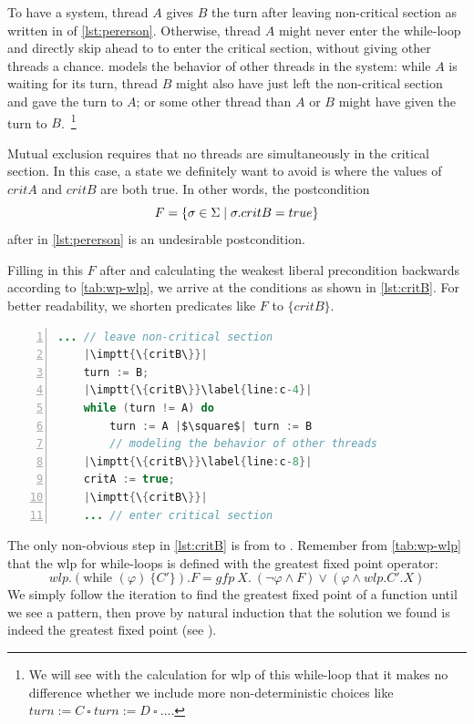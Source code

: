To have a  system, thread $A$ gives $B$ the turn after leaving non-critical section as written in  of \autoref{lst:pererson}. 
Otherwise, thread $A$ might never enter the while-loop and directly skip ahead to  to enter the critical section, without giving other threads a chance. 
 models the behavior of other threads in the system: while $A$ is waiting for its turn, thread $B$ might also have just left the non-critical section and gave the turn to $A$; or some other thread than $A$ or $B$ might have given the turn to $B$.~\footnote{We will see with the calculation for wlp of this while-loop that it makes no difference whether we include more non-deterministic choices like $turn := C\ \square\ turn := D\ \square\ \dots$.} 

Mutual exclusion requires that no threads are simultaneously in the critical section. 
In this case, a state we definitely want to avoid is where the values of $critA$ and $critB$ are both true. 
In other words, the postcondition 
$$F=\{\sigma\in\S\mid \sigma.critB=true\}$$ 
after  in \autoref{lst:pererson} is an undesirable postcondition.

Filling in this $F$ after  and calculating the weakest liberal precondition backwards according to \autoref{tab:wp-wlp}, we arrive at the conditions as shown in \autoref{lst:critB}. 
For better readability, we shorten predicates like $F$ to $\{critB\}$.

\begin{lstlisting}[caption={Weakest Liberal Precondition w.r.t Postcondition $F=\{\sigma\in\S\mid \sigma.critB=true\}$ }, label={lst:critB}, language=java, numbers=left, stepnumber=1, captionpos=b,escapechar=|,frame=single]
	... // leave non-critical section
	|\imptt{\{critB\}}|
	turn := B;
	|\imptt{\{critB\}}\label{line:c-4}|
	while (turn != A) do 
		turn := A |$\square$| turn := B 
		// modeling the behavior of other threads
	|\imptt{\{critB\}}\label{line:c-8}|
	critA := true;
	|\imptt{\{critB\}}|
	... // enter critical section  
\end{lstlisting}

The only non-obvious step in \autoref{lst:critB} is from  to . 
Remember from \autoref{tab:wp-wlp} that the wlp for while-loops is defined with the greatest fixed point operator: 
\[
	wlp.(\text{while }(\varphi)\ \{C'\}).F = gfp\ X.\ (\neg\varphi\wedge F)\vee(\varphi\wedge wlp.C'.X)
\]
We simply follow the iteration to find the greatest fixed point of a function until we see a pattern, then prove by natural induction that the solution we found is indeed the greatest fixed point (see ).

